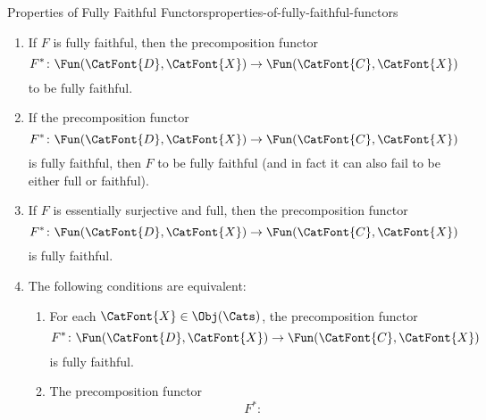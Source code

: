 \begin{proposition}{Properties of Fully Faithful Functors}{properties-of-fully-faithful-functors}
\begin{enumerate}
\begin{enumerate}
            \end{enumerate}
        \item\label{properties-of-fully-faithful-functors-interaction-with-precomposition-1}If $F$ is fully faithful, then the precomposition functor
            \[
                F^{*}
                \colon
                \Fun(\CatFont{D},\CatFont{X})
                \to
                \Fun(\CatFont{C},\CatFont{X})
            \]%
             to be fully faithful.
        \item\label{properties-of-fully-faithful-functors-interaction-with-precomposition-2}If the precomposition functor
            \[
                F^{*}
                \colon
                \Fun(\CatFont{D},\CatFont{X})
                \to
                \Fun(\CatFont{C},\CatFont{X})
            \]%
            is fully faithful, then $F$  to be fully faithful (and in fact it can also fail to be either full or faithful).
        \item\label{properties-of-fully-faithful-functors-interaction-with-precomposition-3}If $F$ is essentially surjective and full, then the precomposition functor
            \[
                F^{*}
                \colon
                \Fun(\CatFont{D},\CatFont{X})
                \to
                \Fun(\CatFont{C},\CatFont{X})
            \]%
            is fully faithful.
        \item\label{properties-of-fully-faithful-functors-interaction-with-precomposition-4}The following conditions are equivalent:
            \begin{enumerate}
                \item\label{properties-of-fully-faithful-functors-interaction-with-precomposition-4-a}For each $\CatFont{X}\in\Obj(\Cats)$, the precomposition functor
                    \[
                        F^{*}
                        \colon
                        \Fun(\CatFont{D},\CatFont{X})
                        \to
                        \Fun(\CatFont{C},\CatFont{X})
                    \]%
                    is fully faithful.
                \item\label{properties-of-fully-faithful-functors-interaction-with-precomposition-4-b}The precomposition functor
                    \[
                        F^{*}
                        \colon
\]
\end{enumerate}
\end{enumerate}
\end{proposition}
